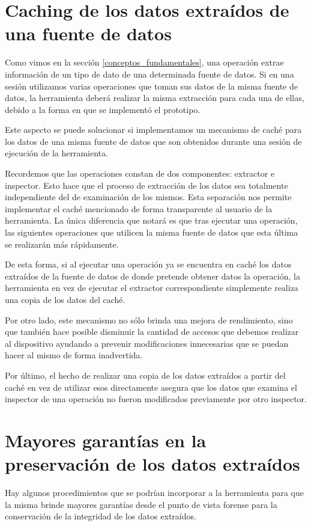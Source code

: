 \section{Caching de los datos extraídos de una fuente de datos}
Como vimos en la sección \ref{conceptos_fundamentales}, una operación extrae información de un tipo de dato de una determinada fuente de datos. Si en una sesión utilizamos varias operaciones que toman sus datos de la misma fuente de datos, la herramienta deberá realizar la misma extracción para cada una de ellas, debido a la forma en que se implementó el prototipo.

Este aspecto se puede solucionar si implementamos un mecanismo de caché para los datos de una misma fuente de datos que son obtenidos durante una sesión de ejecución de la herramienta.

Recordemos que las operaciones constan de dos componentes: extractor e inspector. Esto hace que el proceso de extracción de los datos sea totalmente independiente del de examinación de los mismos. Esta separación nos permite implementar el caché mencionado de forma transparente al usuario de la herramienta. La única diferencia que notará es que tras ejecutar una operación, las siguientes operaciones que utilicen la misma fuente de datos que esta última se realizarán más rápidamente.

De esta forma, si al ejecutar una operación ya se encuentra en caché los datos extraídos de la fuente de datos de donde pretende obtener datos la operación, la herramienta en vez de ejecutar el extractor correspondiente simplemente realiza una copia de los datos del caché.

Por otro lado, este mecanismo no sólo brinda una mejora de rendimiento, sino que también hace posible disminuir la cantidad de accesos que debemos realizar al dispositivo ayudando a prevenir modificaciones innecesarias que se puedan hacer al mismo de forma inadvertida.

Por último, el hecho de realizar una copia de los datos extraídos a partir del caché en vez de utilizar esos directamente asegura que los datos que examina el inspector de una operación no fueron modificados previamente por otro inspector.

\section{Mayores garantías en la preservación de los datos extraídos}
Hay algunos procedimientos que se podrían incorporar a la herramienta para que la misma brinde mayores garantías desde el punto de vista forense para la conservación de la integridad de los datos extraídos.

